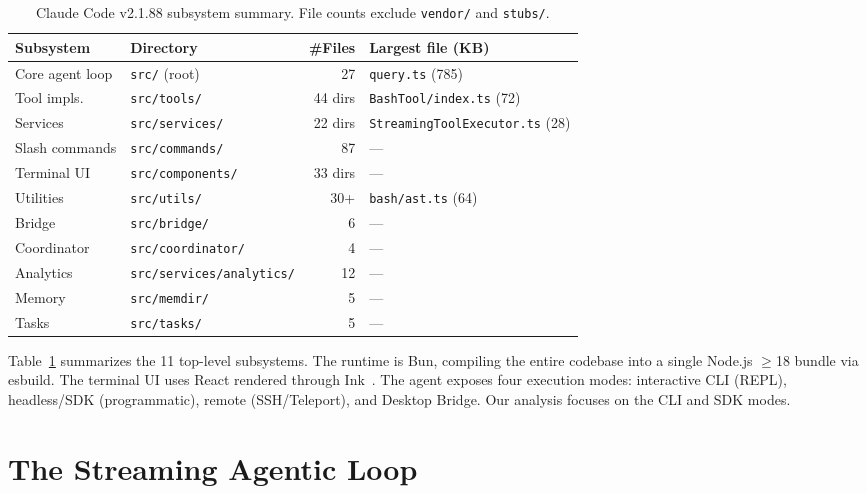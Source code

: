 \documentclass{article}
\newcommand{\file}[1]{\texttt{\small #1}}
\begin{document}
\begin{table}[t]
\centering
\caption{Claude Code v2.1.88 subsystem summary. File counts exclude \texttt{vendor/} and \texttt{stubs/}.}
\label{tab:subsystems}
\small
\begin{tabular}{llrl}
\toprule
\textbf{Subsystem} & \textbf{Directory} & \textbf{\#Files} & \textbf{Largest file (KB)} \\
\midrule
Core agent loop   & \file{src/} (root)         & 27  & \file{query.ts} (785) \\
Tool impls.       & \file{src/tools/}          & 44 dirs & \file{BashTool/index.ts} (72) \\
Services          & \file{src/services/}       & 22 dirs & \file{StreamingToolExecutor.ts} (28) \\
Slash commands    & \file{src/commands/}       & 87  & --- \\
Terminal UI       & \file{src/components/}     & 33 dirs & --- \\
Utilities         & \file{src/utils/}          & 30+ & \file{bash/ast.ts} (64) \\
Bridge            & \file{src/bridge/}         & 6   & --- \\
Coordinator       & \file{src/coordinator/}    & 4   & --- \\
Analytics         & \file{src/services/analytics/} & 12 & --- \\
Memory            & \file{src/memdir/}         & 5   & --- \\
Tasks             & \file{src/tasks/}          & 5   & --- \\
\bottomrule
\end{tabular}
\end{table}

Table~\ref{tab:subsystems} summarizes the 11 top-level subsystems. The runtime is Bun, compiling the entire codebase into a single Node.js $\geq$18 bundle via esbuild. The terminal UI uses React rendered through Ink~\cite{ink2023}. The agent exposes four execution modes: interactive CLI (REPL), headless/SDK (programmatic), remote (SSH/Teleport), and Desktop Bridge. Our analysis focuses on the CLI and SDK modes.

\section{The Streaming Agentic Loop}
\label{sec:loop}
\end{document}
